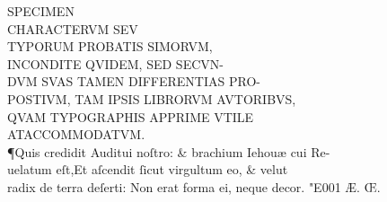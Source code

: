 \documentclass{article}
\begin{document}
\centering
{{
		\fontsize{19}{16}\selectfont  SPECIMEN \\
		\fontsize{41}{33}\selectfont CHARACTERVM SEV \\
		\fontsize{23}{25}\selectfont TYPORUM PROBATIS SIMORVM\kern-3pt, \\
		\fontsize{19}{17}\selectfont INCONDITE QVIDEM, SED SECVN\kern-3pt-\\
		\fontsize{14}{16}\selectfont DVM SVAS TAMEN DIFFERENTIAS PRO\kern-2pt- \\
		\fontsize{9.5}{11.5}\selectfont POSTIVM, TAM IPSIS LIBRORVM AVTORIBVS\kern-2pt,\\
		\fontsize{7}{9}\selectfont QVAM TYPOGRAPHIS APPRIME VTILE\\
		\fontsize{5}{4}\selectfont AT\quad ACCOMMODATVM.\\}
\justifying
\huge
\noindent \P \quad Quis credidit Auditui noſtro: \& brachium Iehou\ae{} cui Re-\\
uelatum eſt,Et aſcendit ſicut virgultum  eo, \& velut\\
radix de terra deſerti: Non erat forma ei, neque decor. \char"E001{} \AE{}. \OE .

}
\end{document}
